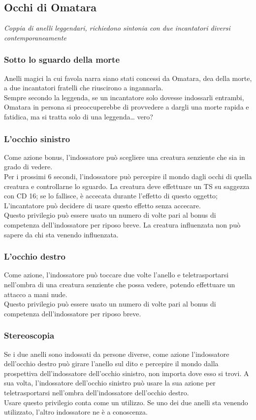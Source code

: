 \subsection{Occhi di Omatara}
\textit{Coppia di anelli leggendari, richiedono sintonia con due incantatori diversi contemporaneamente}

\subsubsection{Sotto lo sguardo della morte}
Anelli magici la cui favola narra siano stati concessi da Omatara, dea della morte, a due incantatori fratelli che riuscirono a ingannarla. \\ Sempre secondo la leggenda, se un incantatore solo dovesse indossarli entrambi, Omatara in persona si preoccuperebbe di provvedere a dargli una morte rapida e fatidica, ma si tratta solo di una leggenda… vero? 

\subsubsection{L'occhio sinistro}
Come azione bonus, l'indossatore può scegliere una creatura senziente che sia in grado di vedere. \\ Per i prossimi 6 secondi, l'indossatore può percepire il mondo dagli occhi di quella creatura e controllarne lo sguardo. La creatura deve effettuare un TS su saggezza con CD 16; se lo fallisce, è accecata durante l'effetto di questo oggetto; L'incantatore può decidere di usare questo effetto senza accecare. \\ Questo privilegio può essere usato un numero di volte pari al bonus di competenza dell'indossatore per riposo breve. La creatura influenzata non può sapere da chi sta venendo influenzata.

\subsubsection{L'occhio destro}
Come azione, l'indossatore può toccare due volte l'anello e teletrasportarsi nell'ombra di una creatura senziente che possa vedere, potendo effettuare un attacco a mani nude. \\ Questo privilegio può essere usato un numero di volte pari al bonus di competenza dell'indossatore per riposo breve.

\subsubsection{Stereoscopia}
Se i due anelli sono indossati da persone diverse, come azione l'indossatore dell'occhio destro può girare l'anello sul dito e percepire il mondo dalla prospettiva dell'indossatore dell'occhio sinistro, non importa dove esso si trovi. A sua volta, l'indossatore dell'occhio sinistro può usare la sua azione per teletrasportarsi nell'ombra dell'indossatore dell'occhio destro. \\ Usare questo privilegio conta come un utilizzo. Se uno dei due anelli sta venendo utilizzato, l'altro indossatore ne è a conoscenza.